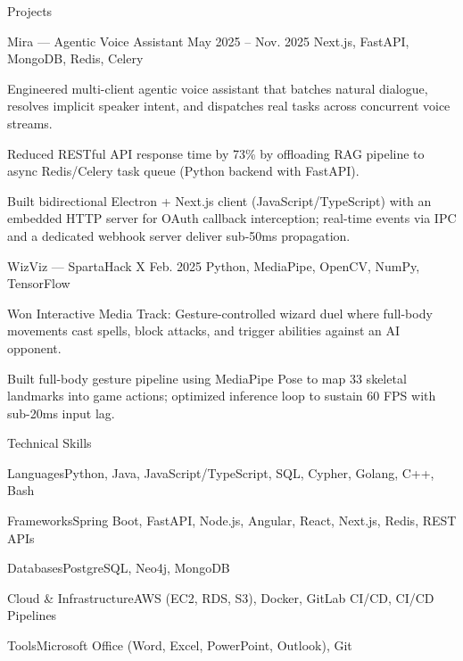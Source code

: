 \documentclass[
	11pt
]{../../../resume}
\begin{document}
	\begin{rSection}{P}{rojects}
		\begin{rSectionEntry}
			{Mira --- Agentic Voice Assistant}
			{May 2025 -- Nov. 2025}
			{}
			{Next.js, FastAPI, MongoDB, Redis, Celery}
			{}

			\item Engineered multi-client agentic voice assistant that batches natural dialogue, resolves implicit speaker intent, and dispatches real tasks across concurrent voice streams.
			\item Reduced RESTful API response time by 73\% by offloading RAG pipeline to async Redis/Celery task queue (Python backend with FastAPI).
			\item Built bidirectional Electron + Next.js client (JavaScript/TypeScript) with an embedded HTTP server for OAuth callback interception; real-time events via IPC and a dedicated webhook server deliver sub-50ms propagation.
		\end{rSectionEntry}

		\begin{rSectionEntry}
			{WizViz --- SpartaHack X}
			{Feb. 2025}
			{}
			{Python, MediaPipe, OpenCV, NumPy, TensorFlow}
			{}

			\item Won Interactive Media Track: Gesture-controlled wizard duel where full-body movements cast spells, block attacks, and trigger abilities against an AI opponent.
			\item Built full-body gesture pipeline using MediaPipe Pose to map 33 skeletal landmarks into game actions; optimized inference loop to sustain 60 FPS with sub-20ms input lag.
		\end{rSectionEntry}
	\end{rSection}

	\begin{rSection}{T}{echnical Skills}
		\begin{rSet}{Languages}{Python, Java, JavaScript/TypeScript, SQL, Cypher, Golang, C++, Bash}
		\end{rSet}
		\begin{rSet}{Frameworks}{Spring Boot, FastAPI, Node.js, Angular, React, Next.js, Redis, REST APIs}
		\end{rSet}
		\begin{rSet}{Databases}{PostgreSQL, Neo4j, MongoDB}
		\end{rSet}
		\begin{rSet}{Cloud \& Infrastructure}{AWS (EC2, RDS, S3), Docker, GitLab CI/CD, CI/CD Pipelines}
		\end{rSet}
		\begin{rSet}{Tools}{Microsoft Office (Word, Excel, PowerPoint, Outlook), Git}
		\end{rSet}
	\end{rSection}
\end{document}
